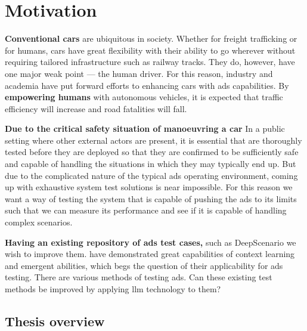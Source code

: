 \chapter*{Motivation}

\textbf{Conventional cars} are ubiquitous in society. Whether for freight trafficking or for humans, cars have great flexibility with their ability to go wherever without requiring tailored infrastructure
such as railway tracks. They do, however, have one major weak point --- the human driver. For this
reason, industry and academia have put forward efforts to enhancing cars with \acrfull{ads}
capabilities.
By \textbf{empowering humans} with autonomous vehicles, it is expected that traffic efficiency will
increase and road fatalities will fall.

\textbf{Due to the critical safety situation of manoeuvring a car} In a public setting where other external
actors are present, it is essential that  are thoroughly tested before they are
deployed so that they are confirmed to be sufficiently safe and capable of handling the situations in which
they may typically end up.
But due to the complicated nature of the typical \acrshort{ads} operating environment, coming up with
exhaustive system test solutions is near impossible.
For this reason we want a way of testing the system that is capable of pushing the \acrlong{ads} to
its limits such that we can measure its performance and see if it is capable of
handling complex scenarios.

\textbf{Having an existing repository of \acrlong{ads} test cases,} such as
DeepScenario we wish to improve them. \textbf{} have demonstrated
great capabilities of context learning and emergent abilities, which begs
the question of their  applicability for \acrshort{ads} testing.  There are
various methods of testing  \acrlong{ads}. Can these existing test methods be
improved by applying \acrshort{llm} technology to them?


\newpage %

\section{Thesis overview}

